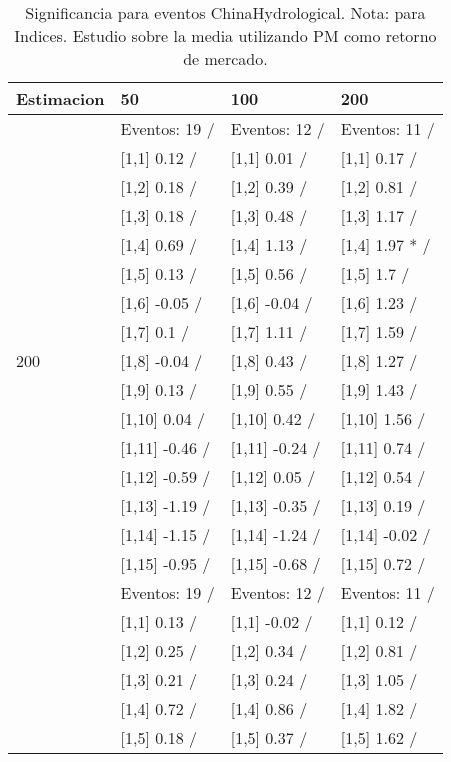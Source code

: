 \begin{table}

\caption{Significancia para eventos ChinaHydrological. Nota: para Indices. Estudio sobre la media utilizando PM como retorno de mercado.}
\centering
\begin{tabular}[t]{llll}
\toprule
Estimacion & 50 & 100 & 200\\
\midrule
 & Eventos:  19 / & Eventos:  12 / & Eventos:  11 /\\
 & {}[1,1] 0.12  / & {}[1,1] 0.01  / & {}[1,1] 0.17  /\\
 & {}[1,2] 0.18  / & {}[1,2] 0.39  / & {}[1,2] 0.81  /\\
 & {}[1,3] 0.18  / & {}[1,3] 0.48  / & {}[1,3] 1.17  /\\
 & {}[1,4] 0.69  / & {}[1,4] 1.13  / & {}[1,4] 1.97 * /\\
\addlinespace
 & {}[1,5] 0.13  / & {}[1,5] 0.56  / & {}[1,5] 1.7  /\\
 & {}[1,6] -0.05  / & {}[1,6] -0.04  / & {}[1,6] 1.23  /\\
 & {}[1,7] 0.1  / & {}[1,7] 1.11  / & {}[1,7] 1.59  /\\
200 & {}[1,8] -0.04  / & {}[1,8] 0.43  / & {}[1,8] 1.27  /\\
 & {}[1,9] 0.13  / & {}[1,9] 0.55  / & {}[1,9] 1.43  /\\
\addlinespace
 & {}[1,10] 0.04  / & {}[1,10] 0.42  / & {}[1,10] 1.56  /\\
 & {}[1,11] -0.46  / & {}[1,11] -0.24  / & {}[1,11] 0.74  /\\
 & {}[1,12] -0.59  / & {}[1,12] 0.05  / & {}[1,12] 0.54  /\\
 & {}[1,13] -1.19  / & {}[1,13] -0.35  / & {}[1,13] 0.19  /\\
 & {}[1,14] -1.15  / & {}[1,14] -1.24  / & {}[1,14] -0.02  /\\
\addlinespace
 & {}[1,15] -0.95  / & {}[1,15] -0.68  / & {}[1,15] 0.72  /\\
 & Eventos:  19 / & Eventos:  12 / & Eventos:  11 /\\
 & {}[1,1] 0.13  / & {}[1,1] -0.02  / & {}[1,1] 0.12  /\\
 & {}[1,2] 0.25  / & {}[1,2] 0.34  / & {}[1,2] 0.81  /\\
 & {}[1,3] 0.21  / & {}[1,3] 0.24  / & {}[1,3] 1.05  /\\
\addlinespace
 & {}[1,4] 0.72  / & {}[1,4] 0.86  / & {}[1,4] 1.82  /\\
 & {}[1,5] 0.18  / & {}[1,5] 0.37  / & {}[1,5] 1.62  /\\

\end{tabular}
\end{table}
